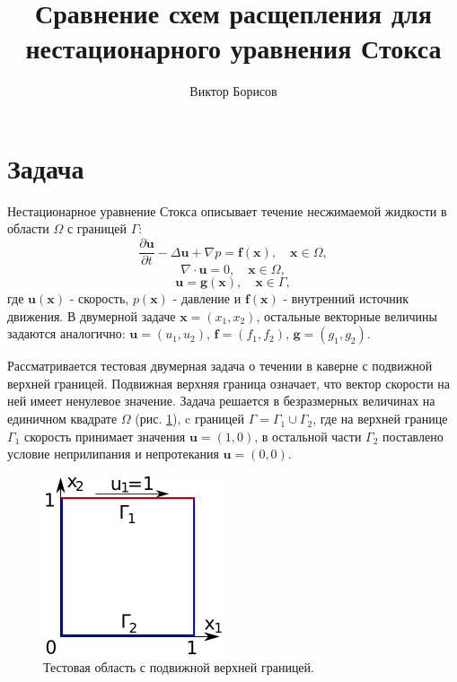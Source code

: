 \documentclass[12pt]{article}
\title{Сравнение схем расщепления для нестационарного уравнения Стокса}
\author{Виктор Борисов}
\begin{document}
\maketitle

\section{Задача}
Нестационарное уравнение Стокса описывает течение несжимаемой жидкости в области $\Omega$ с границей $\Gamma$:
\begin{equation}
\frac{\partial {\bm u}}{\partial t} -\Delta {\bm u} + \nabla p = {\bm f}({\bm x}), \quad {\bm x} \in \Omega,
\end{equation}
\begin{equation}
\nabla\cdot{\bm u} = 0, \quad {\bm x} \in \Omega,
\end{equation}
\begin{equation}
{\bm u} = {\bm g}({\bm x}), \quad {\bm x} \in \Gamma,
\end{equation}
где ${\bm u}({\bm x})$ - скорость, $p({\bm x})$ - давление и ${\bm f}({\bm x})$ - внутренний источник движения. В двумерной задаче ${\bm x}=(x_1, x_2)$, остальные векторные величины задаются аналогично: ${\bm u}=(u_1, u_2)$, ${\bm f}=(f_1, f_2)$, ${\bm g}=(g_1, g_2)$.

Рассматривается тестовая двумерная задача о течении в каверне с подвижной верхней границей. Подвижная верхняя граница означает, что вектор скорости на ней имеет ненулевое значение. Задача решается в безразмерных величинах на единичном квадрате $\Omega$ (рис. \ref{fg:cavity}), c границей $\Gamma=\Gamma_1 \cup \Gamma_2$, где на верхней границе $\Gamma_1$ скорость принимает значения ${\bm u}=(1, 0)$, в остальной части $\Gamma_2$ поставлено условие неприлипания и непротекания ${\bm u}=(0, 0)$.

\begin{figure}
	\begin{center}
		\includegraphics[width=200px]{pics/cavity400}
		\caption{Тестовая область с подвижной верхней границей.}
		\label{fg:cavity}
	\end{center}
\end{figure}
\end{document}
